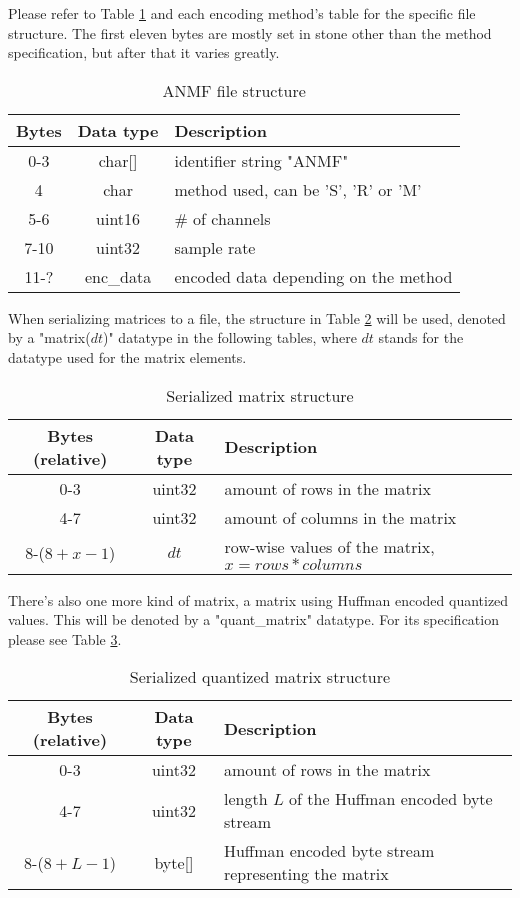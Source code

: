 Please refer to Table \ref{tab:anmf_file} and each encoding method's table for the specific file structure. The first eleven bytes are mostly set in stone other than the method specification, but after that it varies greatly.

\begin{table}[htbp]\caption{ANMF file structure}
	\label{tab:anmf_file}
	\centering
	\begin{tabular}{|c|c|l|}
		\hline
		Bytes & Data type & Description \\ \hline
		0-3 & char[] & identifier string "ANMF" \\
		4 & char & method used, can be 'S', 'R' or 'M' \\
		5-6 & uint16 & \# of channels \\
		7-10 & uint32 & sample rate \\
		11-? & enc\_data & encoded data depending on the method \\
		\hline
	\end{tabular}
\end{table}

When serializing matrices to a file, the structure in Table \ref{tab:anmf_serial_matrix} will be used, denoted by a "matrix($dt$)" datatype in the following tables, where $dt$ stands for the datatype used for the matrix elements.

\begin{table}[htbp]\caption{Serialized matrix structure}
	\label{tab:anmf_serial_matrix}
	\centering
	\begin{tabular}{|c|c|l|}
		\hline
		Bytes (relative) & Data type & Description \\ \hline
		0-3 & uint32 & amount of rows in the matrix \\
		4-7 & uint32 & amount of columns in the matrix \\
		8-($8+x-1$) & $dt$ & row-wise values of the matrix, $x = rows*columns$ \\
		\hline
	\end{tabular}
\end{table}

There's also one more kind of matrix, a matrix using Huffman encoded quantized values. This will be denoted by a "quant\_matrix" datatype. For its specification please see Table \ref{tab:anmf_serial_quant_matrix}.

\begin{table}[htbp]\caption{Serialized quantized matrix structure}
	\label{tab:anmf_serial_quant_matrix}
	\centering
	\begin{tabular}{|c|c|l|}
		\hline
		Bytes (relative) & Data type & Description \\ \hline
		0-3 & uint32 & amount of rows in the matrix \\
		4-7 & uint32 & length $L$ of the Huffman encoded byte stream \\
		8-($8+L-1$) & byte[] & Huffman encoded byte stream representing the matrix \\
		\hline
	\end{tabular}
\end{table}


